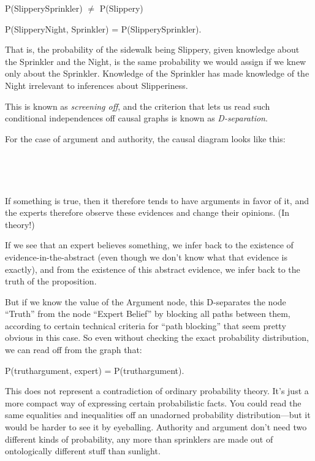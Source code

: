 {\centering
 P(Slippery{\textbar}Sprinkler) ${\neq}$ P(Slippery)
\par}


\bigskip

{\centering
 P(Slippery{\textbar}Night, Sprinkler) =
P(Slippery{\textbar}Sprinkler).
\par}


\bigskip

{
 That is, the probability of the sidewalk being Slippery, given
knowledge about the Sprinkler and the Night, is the same probability we
would assign if we knew only about the Sprinkler. Knowledge of the
Sprinkler has made knowledge of the Night irrelevant to inferences
about Slipperiness.}

{
 This is known as \textit{screening off}, and the criterion that
lets us read such conditional independences off causal graphs is known
as \textit{D-separation}.}

{
 For the case of argument and authority, the causal diagram looks
like this:}

{
 ~}



{
 ~}

{
 If something is true, then it therefore tends to have arguments in
favor of it, and the experts therefore observe these evidences and
change their opinions. (In theory!)}

{
 If we see that an expert believes something, we infer back to the
existence of evidence-in-the-abstract (even though we
don't know what that evidence is exactly), and from the
existence of this abstract evidence, we infer back to the truth of the
proposition.}

{
 But if we know the value of the Argument node, this D-separates
the node ``Truth'' from the node
``Expert Belief'' by blocking all
paths between them, according to certain technical criteria for
``path blocking'' that seem pretty
obvious in this case. So even without checking the exact probability
distribution, we can read off from the graph that:}

{\centering
 P(truth{\textbar}argument, expert) = P(truth{\textbar}argument).
\par}


\bigskip

{
 This does not represent a contradiction of ordinary probability
theory. It's just a more compact way of expressing
certain probabilistic facts. You could read the same equalities and
inequalities off an unadorned probability distribution---but it would
be harder to see it by eyeballing. Authority and argument
don't need two different kinds of probability, any more
than sprinklers are made out of ontologically different stuff than
sunlight. }

